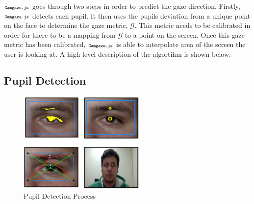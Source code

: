 \documentclass[annual]{acmsiggraph}
\newcommand{\Acronym}[1]{\ensuremath{{\small{\texttt{#1}}}}}
\newcommand{\Name}{\Acronym{Camgaze.js}} \newcommand{\False}{\Constant{false}}
\newcommand{\True}{\Constant{true}}
\newcommand{\Symbol}[1]{\ensuremath{\mathcal{#1}}}
\newcommand{\Function}[1]{\ensuremath{{\small \textsc{#1}}}}
\newcommand{\Constant}[1]{\ensuremath{\small{\texttt{#1}}}}
\begin{document}
$\Name$ goes through two steps in order to predict the gaze direction.
Firstly, $\Name$ detects each pupil. It then uses the pupils deviation
from a unique point on the face to determine the gaze metric, \Symbol{G}.
This metric needs to be calibrated in order for there to be a mapping
from \Symbol{G} to a point on the screen. Once this gaze metric has been
calibrated, $\Name$ is able to interpolate area of the screen the user is
looking at. A high level description of the algortihm is shown below.

%
%
%
%
%

\subsection{Pupil Detection}

\begin{figure}[ht]

    \centering

    \includegraphics[width=2.5in]{figs/pupilDetection.pdf}

    \caption{Pupil Detection Process}

\end{figure}
\end{document}
